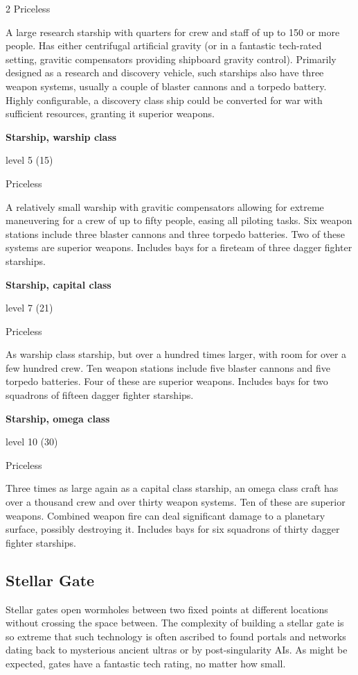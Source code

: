 \begin{multicols}{2}
Priceless 

A large research starship with quarters for crew and staff of up to 150 or more people. Has either centrifugal artificial gravity (or in a fantastic tech-rated setting, gravitic compensators providing shipboard gravity control). Primarily designed as a research and discovery vehicle, such starships also have three weapon systems, usually a couple of blaster cannons and a torpedo battery. Highly configurable, a discovery class ship could be converted for war with sufficient resources, granting it superior weapons. 

\textbf{Starship, warship class}

level 5 (15) 

Priceless 

A relatively small warship with gravitic compensators allowing for extreme maneuvering for a crew of up to fifty people, easing all piloting tasks. Six weapon stations include three blaster cannons and three torpedo batteries. Two of these systems are superior weapons. Includes bays for a fireteam of three dagger fighter starships.

\textbf{Starship, capital class} 

level 7 (21) 

Priceless 

As warship class starship, but over a hundred times larger, with room for over a few hundred crew. Ten weapon stations include five blaster cannons and five torpedo batteries. Four of these are superior weapons. Includes bays for two squadrons of fifteen dagger fighter starships. 

\textbf{Starship, omega class} 

level 10 (30) 

Priceless 

Three times as large again as a capital class starship, an omega class craft has over a thousand crew and over thirty weapon systems. Ten of these are superior weapons. Combined weapon fire can deal significant damage to a planetary surface, possibly destroying it. Includes bays for six squadrons of thirty dagger fighter starships.

\subsection{Stellar Gate}

Stellar gates open wormholes between two fixed points at different locations without crossing the space between. The complexity of building a stellar gate is so extreme that such technology is often ascribed to found portals and networks dating back to mysterious ancient ultras or by post-singularity AIs. As might be expected, gates have a fantastic tech rating, no matter how small.


\end{multicols}
